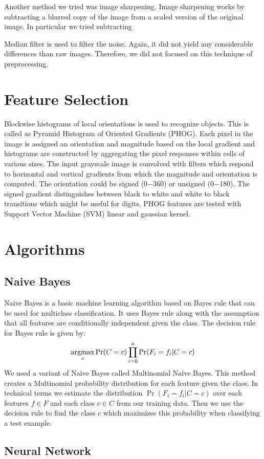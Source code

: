 \documentclass[10pt,twocolumn]{article}
\newcommand{\argmax}{\operatornamewithlimits{argmax}}
\begin{document}
Another method we tried was image sharpening. Image sharpening works by subtracting a blurred copy of the image from a scaled version of the original image. In particular we tried subtracting 

Median filter is used to filter the noise. Again, it did not yield any considerable differences than raw images. Therefore, we did not focused on this technique of preprocessing.
\section{Feature Selection}
\cite {Maji09fastand} Blockwise histograms of local orientations is used to recognize objects. This is called as Pyramid Histogram of Oriented Gradients (PHOG). Each pixel in the image is assigned an orientation and magnitude based on the local gradient and histograms are constructed by aggregating the pixel responses within cells of various sizes. The input grayscale image is convolved with filters which respond to horizontal and vertical gradients from which the magnitude and orientation is computed. The orientation could be signed (0−360) or unsigned (0−180). The signed gradient distinguishes between black to white and white to black transitions which might be useful for digits. PHOG features are tested with Support Vector Machine (SVM) linear and gaussian kernel. 
\section{Algorithms}
\subsection{Naive Bayes}
Naive Bayes is a basic machine learning algorithm based on Bayes rule that can be used for multiclass classification. It uses Bayes rule along with the assumption that all features are conditionally independent given the class. The decision rule for Bayes rule is given by:
\[ \argmax_c \Pr(C = c) \prod_{i=0}^{n} \Pr(F_i = f_i | C = c)\]
We used a variant of Naive Bayes called Multinomial Naive Bayes. This method creates a Multinomial probability distribution for each feature given the class. In technical terms we estimate the distribution $\Pr(F_i = f_i | C = c)$ over each features $f \in F$ and each class $ c \in C$ from our training data. Then we use the decision rule to find the class $c$ which maximizes this probability when classifying a test example.
\subsection{Neural Network}
\end{document}
